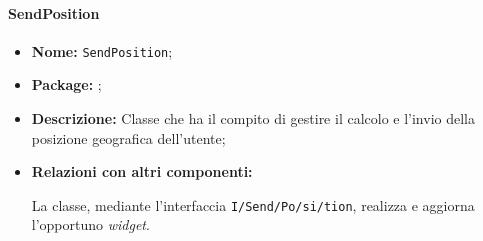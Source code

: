 \paragraph{SendPosition}
\begin{flushleft}
\begin{itemize}
\item \textbf{Nome:} \texttt{SendPosition};
\item \textbf{Package:} \texttt{\logicUser};
\item \textbf{Descrizione:} Classe che ha il compito di gestire il calcolo e l'invio della posizione geografica dell'utente;
\item \textbf{Relazioni con altri componenti:}
\begin{sloppypar}
La classe, mediante l'interfaccia \texttt{\logicUser{}I\fshyp{}Send\fshyp{}Po\fshyp{}si\fshyp{}tion}, realizza e aggiorna l'opportuno \textit{widget}.
\end{sloppypar}
\end{itemize}
\end{flushleft}

